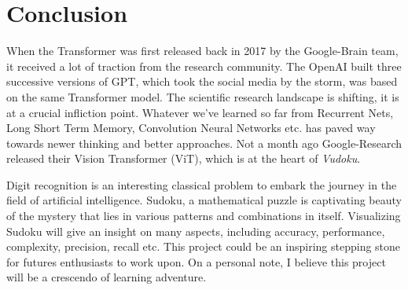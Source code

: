 \documentclass[12pt, a4paper]{report}
\begin{document}
\chapter{Conclusion}
\label{chap:conclusion}
\thispagestyle{fancy}
\hspace{0.5cm} When the Transformer was first released back in 2017 by the Google-Brain team, it received a lot of traction from the research community. The OpenAI built three successive versions of GPT, which took the social media by the storm, was based on the same Transformer model. The scientific research landscape is shifting, it is at a crucial infliction point. Whatever we've learned so far from Recurrent Nets, Long Short Term Memory, Convolution Neural Networks etc. has paved way towards newer thinking and better approaches. Not a month ago Google-Research released their Vision Transformer (ViT), which is at the heart of \emph{Vudoku}.

Digit recognition is an interesting classical problem to embark the journey in the field of artificial intelligence. Sudoku, a mathematical puzzle is captivating beauty of the mystery that lies in various patterns and combinations in itself. Visualizing Sudoku will give an insight on many aspects, including accuracy, performance, complexity, precision, recall etc. This project could be an inspiring stepping stone for futures enthusiasts to work upon. On a personal note, I believe this project will be a crescendo of learning adventure.
\vspace*{\fill}



\thispagestyle{fancy}
\end{document}
